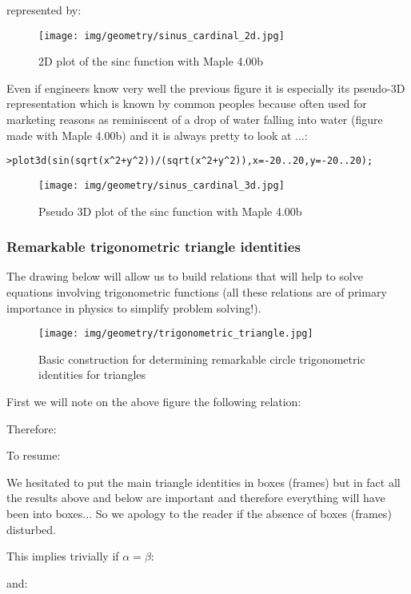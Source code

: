 	represented by:
	\begin{figure}[H]
		\centering
		\texttt{[image: img/geometry/sinus\_cardinal\_2d.jpg]}
		\caption{2D plot of the sinc function with Maple 4.00b}
	\end{figure}
	Even if engineers know very well the previous figure it is especially its pseudo-3D representation which is known by common peoples because often used for marketing reasons as reminiscent of a drop of water falling into water (figure made with Maple 4.00b) and it is always pretty to look at ...:

\texttt{>plot3d(sin(sqrt(x\string^2+y\string^2))/(sqrt(x\string^2+y\string^2)),x=-20..20,y=-20..20);}

\begin{figure}[H]
\centering
\texttt{[image: img/geometry/sinus\_cardinal\_3d.jpg]}
\caption{Pseudo 3D plot of the sinc function with Maple 4.00b}
\end{figure}

	\subsubsection{Remarkable trigonometric triangle identities}

		The drawing below will allow us to build relations that will help to solve equations involving trigonometric functions (all these relations are of primary importance in physics to simplify problem solving!).

\begin{figure}[H]
\centering
\texttt{[image: img/geometry/trigonometric\_triangle.jpg]}
\caption{Basic construction for determining remarkable circle trigonometric identities for triangles}
\end{figure}

	First we will note on the above figure the following relation:
	
	Therefore:
	
	To resume:
	
	\begin{tcolorbox}[title=Remark,colframe=black,arc=10pt]
	We hesitated to put the main triangle identities in boxes (frames) but in fact all the results above and below are important and therefore everything will have been into boxes... So we apology to the reader if the absence of boxes (frames) disturbed.
	\end{tcolorbox}
	This implies trivially if $\alpha=\beta$:
	
	and:
	
